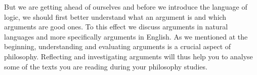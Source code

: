 


%
%
%
%


But we are getting ahead of ourselves and before we introduce the language of logic, we should first better understand what an argument is and which arguments are good ones. To this effect we discuss arguments in natural languages and more specifically arguments in English. As we mentioned at the beginning, understanding and evaluating arguments is a crucial aspect of philosophy. Reflecting and investigating arguments will thus help you to analyse some of the texts you are reading during your philosophy studies.


